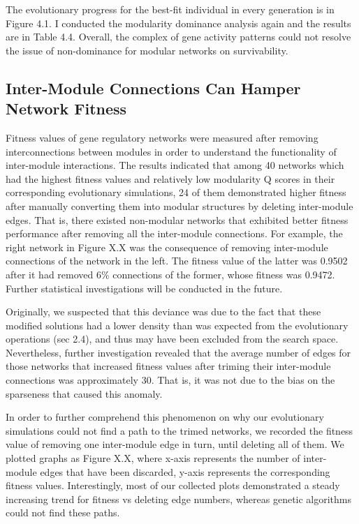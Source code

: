 The evolutionary progress for the best-fit individual in every generation is in Figure 4.1. I conducted the modularity dominance analysis again and the results are in Table 4.4. Overall, the complex of gene activity patterns could not resolve the issue of non-dominance for modular networks on survivability. 

\subsection{Inter-Module Connections Can Hamper Network Fitness}
Fitness values of gene regulatory networks were measured after removing interconnections between modules in order to understand the functionality of inter-module interactions. The results indicated that among 40 networks which had the highest fitness values and relatively low modularity Q scores in their corresponding evolutionary simulations, 24 of them demonstrated higher fitness after manually converting them into modular structures by deleting inter-module edges. That is, there existed non-modular networks that exhibited better fitness performance after removing all the inter-module connections. For example, the right network in Figure X.X was the consequence of removing inter-module connections of the network in the left. The fitness value of the latter was 0.9502 after it had removed 6\% connections of the former, whose fitness was 0.9472. Further statistical investigations will be conducted in the future.

Originally, we suspected that this deviance was due to the fact that these modified solutions had a lower density than was expected from the evolutionary operations (sec 2.4), and thus may have been excluded from the search space. Nevertheless, further investigation revealed that the average number of edges for those networks that increased fitness values after triming their inter-module connections was approximately 30. That is, it was not due to the bias on the sparseness that caused this anomaly. 

In order to further comprehend this phenomenon on why our evolutionary simulations could not find a path to the trimed networks, we recorded the fitness value of removing one inter-module edge in turn, until deleting all of them. We plotted graphs as Figure X.X, where x-axis represents the number of inter-module edges that have been discarded, y-axis represents the corresponding fitness values. Interestingly, most of our collected plots demonstrated a steady increasing trend for fitness vs deleting edge numbers, whereas genetic algorithms could not find these paths. 

